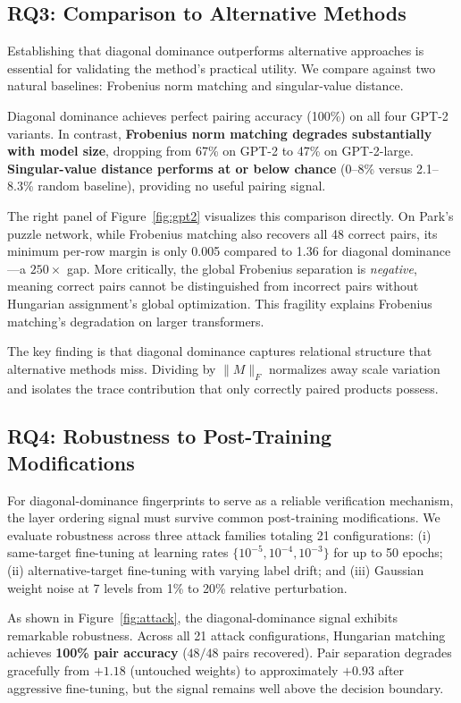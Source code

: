 \documentclass[wcp]{jmlr}
\begin{document}
\subsection{RQ3: Comparison to Alternative Methods}

Establishing that diagonal dominance outperforms alternative approaches is essential for validating the method's practical utility. We compare against two natural baselines: Frobenius norm matching and singular-value distance.

Diagonal dominance achieves perfect pairing accuracy (100\%) on all four GPT-2 variants. In contrast, \textbf{Frobenius norm matching degrades substantially with model size}, dropping from 67\% on GPT-2 to 47\% on GPT-2-large. \textbf{Singular-value distance performs at or below chance} (0--8\% versus 2.1--8.3\% random baseline), providing no useful pairing signal.

The right panel of Figure~\ref{fig:gpt2} visualizes this comparison directly. On Park's puzzle network, while Frobenius matching also recovers all 48 correct pairs, its minimum per-row margin is only 0.005 compared to 1.36 for diagonal dominance---a $250\times$ gap. More critically, the global Frobenius separation is \emph{negative}, meaning correct pairs cannot be distinguished from incorrect pairs without Hungarian assignment's global optimization. This fragility explains Frobenius matching's degradation on larger transformers.

The key finding is that diagonal dominance captures relational structure that alternative methods miss. Dividing by $\|M\|_F$ normalizes away scale variation and isolates the trace contribution that only correctly paired products possess.

\subsection{RQ4: Robustness to Post-Training Modifications}

For diagonal-dominance fingerprints to serve as a reliable verification mechanism, the layer ordering signal must survive common post-training modifications. We evaluate robustness across three attack families totaling 21 configurations: (i) same-target fine-tuning at learning rates $\{10^{-5}, 10^{-4}, 10^{-3}\}$ for up to 50 epochs; (ii) alternative-target fine-tuning with varying label drift; and (iii) Gaussian weight noise at 7 levels from 1\% to 20\% relative perturbation.

As shown in Figure~\ref{fig:attack}, the diagonal-dominance signal exhibits remarkable robustness. Across all 21 attack configurations, Hungarian matching achieves \textbf{100\% pair accuracy} ($48/48$ pairs recovered). Pair separation degrades gracefully from $+1.18$ (untouched weights) to approximately $+0.93$ after aggressive fine-tuning, but the signal remains well above the decision boundary.
\end{document}
